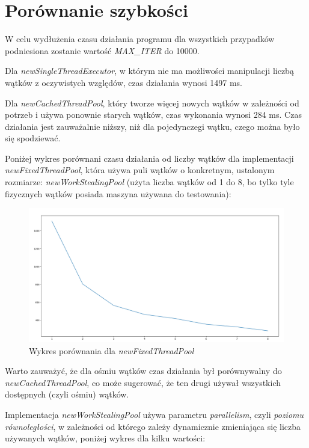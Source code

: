\documentclass{article}
\begin{document}
\section{Porównanie szybkości}

W celu wydłużenia czasu działania programu dla wszystkich przypadków podniesiona zostanie wartość \textit{MAX\_ITER} do 10000.

Dla \textit{newSingleThreadExecutor}, w którym nie ma możliwości manipulacji liczbą wątków z oczywistych względów, czas działania wynosi 1497 ms.

Dla \textit{newCachedThreadPool}, który tworze więcej nowych wątków w zależności od potrzeb i używa ponownie starych wątków, czas wykonania wynosi 284 ms.
Czas działania jest zauważalnie niższy, niż dla pojedynczegi wątku, czego można było się spodziewać.

Poniżej wykres porównani czasu działania od liczby wątków dla implementacji \textit{newFixedThreadPool}, która używa puli wątków o konkretnym, ustalonym rozmiarze:
\textit{newWorkStealingPool} (użyta liczba wątków od 1 do 8, bo tylko tyle fizycznych wątków posiada maszyna używana do testowania):

\begin{figure}[H]
    \centering
    \includegraphics[width=\textwidth]{figure_1.png}
    \caption{Wykres porównania dla \textit{newFixedThreadPool}}
\end{figure}

Warto zauważyć, że dla ośmiu wątków czas działania był porównywalny do \textit{newCachedThreadPool}, co może sugerować, 
że ten drugi używał wszystkich dostępnych (czyli ośmiu) wątków.

Implementacja \textit{newWorkStealingPool} używa parametru \textit{parallelism}, czyli \textit{poziomu równoległości},
w zależności od którego zależy dynamicznie zmieniająca się liczba używanych wątków, poniżej wykres dla kilku wartości:
\end{document}
